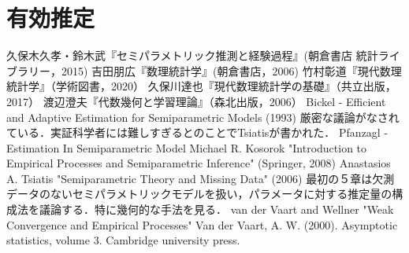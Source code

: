 \documentclass[uplatex,dvipdfmx]{jsreport}
\begin{document}
\chapter{有効推定}

\begin{thebibliography}{99}
    久保木久孝・鈴木武『セミパラメトリック推測と経験過程』(朝倉書店 統計ライブラリー，2015)
    吉田朋広『数理統計学』(朝倉書店，2006)
    竹村彰道『現代数理統計学』（学術図書，2020）
    久保川達也『現代数理統計学の基礎』（共立出版，2017）
    渡辺澄夫『代数幾何と学習理論』（森北出版，2006）
    Bickel - Efficient and Adaptive Estimation for Semiparametric Models (1993)
    厳密な議論がなされている．実証科学者には難しすぎるとのことでTsiatisが書かれた．
    Pfanzagl - Estimation In Semiparametric Model
    Michael R. Kosorok "Introduction to Empirical Processes and Semiparametric Inference" (Springer, 2008)
    Anastasios A. Tsiatis "Semiparametric Theory and Missing Data" (2006)
    最初の５章は欠測データのないセミパラメトリックモデルを扱い，パラメータに対する推定量の構成法を議論する．特に幾何的な手法を見る．
    van der Vaart and Wellner "Weak Convergence and Empirical Processes"
    Van der Vaart, A. W. (2000). Asymptotic statistics, volume 3. Cambridge university press.
\end{thebibliography}
\end{document}
